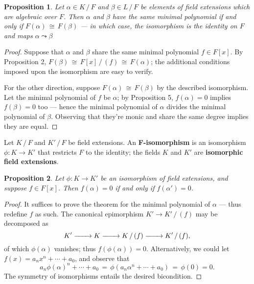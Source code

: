 \documentclass[11pt]{article}
\newtheorem{proposition}{Proposition}
\renewcommand{\longrightarrow}{\xrightarrow{\hspace*{0.7cm}}}
\begin{document}
\begin{adjustwidth}{0.5cm}{}
  \begin{proposition}
    Let $\alpha \in K \, / \, F$ and $\beta \in L \, / \, F$ be elements of field extensions which are algebraic over $F$. Then $\alpha$ and $\beta$ have the same minimal polynomial if and only if $F(\alpha) \, \cong \, F(\beta)$ --- in which case, the isomorphism is the identity on $F$ and maps $\alpha \leadsto \beta$
  \end{proposition}
  \begin{proof}
    Suppose that $\alpha$ and $\beta$ share the same minimal polynomial $f \in F[x]$. By Proposition 2, $F(\beta) \, \cong \, F[x] \, / \, (f) \, \cong \, F(\alpha)$; the additional conditions imposed upon the isomorphism are easy to verify.

    For the other direction,  suppose $F(\alpha) \, \cong \, F(\beta)$ by the described isomorphism. Let the minimal polynomial of $f$ be $\alpha$; by Proposition 5, $f(\alpha) = 0$ implies $f(\beta) = 0$ too --- hence the minimal polynomial of $\alpha$ divides the minimal polynomial of $\beta$. Observing that they're monic and share the same degree implies they are equal.
  \end{proof}
\end{adjustwidth}

Let $K \, / \, F$ and $K' \, / \, F$ be field extensions. An \textbf{F-isomorphism} is an isomorphism $\phi : K \to K'$ that restricts $F$ to the identity; the fields $K$ and $K'$ are \textbf{isomorphic field extensions}.

\begin{adjustwidth}{0.5cm}{}
  \begin{proposition}
    Let $\phi : K \to K'$ be an isomorphism of field extensions, and suppose $f \in F[x]$. Then $f(\alpha) = 0$ if and only if $f(\alpha') = 0$.
  \end{proposition}
  \begin{proof}
    It suffices to prove the theorem for the minimal polynomial of $\alpha$ --- thus redefine $f$ as such. The canonical epimorphism $K' \to K' \, / \, (f)$ may be decomposed as
    \[
      K' \longrightarrow K \longrightarrow K \, / \, (f) \longrightarrow K' \, / \, (f),
    \]
    of which $\phi(\alpha)$ vanishes; thus $f(\phi(\alpha)) = 0$. Alternatively, we could let $f(x) = a_{n}x^{n} + \cdots + a_{0}$, and observe that
    \[
      a_{n} \phi(\alpha)^{n} + \cdots + a_{0} \, = \, \phi(a_{n} \alpha^{n} + \cdots + a_{0}) \, = \, \phi(0) = 0.
    \]
    The symmetry of isomorphisms entails the desired bicondition.
  \end{proof}
\end{adjustwidth}
\end{document}
